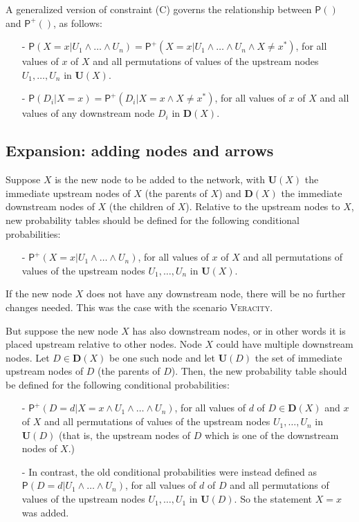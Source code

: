 \documentclass[
  11pt,
  dvipsnames,enabledeprecatedfontcommands]{scrartcl}
\newcommand{\pr}[1]{\ensuremath{\mathsf{P}(#1)}}
\newcommand{\ppr}[2]{\ensuremath{\mathsf{P}^{#1}(#2)}}
\begin{document}
\noindent A generalized version of constraint (C) governs the
relationship between \(\pr{}\) and \(\ppr{+}{}\), as follows:

\begin{itemize}
\item[-] $\pr{X=x \vert U_1 \wedge \dots \wedge U_n}=\ppr{+}{X=x \vert U_1 \wedge \dots \wedge U_n \wedge X\neq x^*}$, for all values of $x$ of $X$ and all permutations of values of the upstream nodes $U_1, \dots, U_n$ in $\mathbf{U}(X)$.
\item[-] $\pr{D_i \vert X =x}=\ppr{+}{D_i \vert X =x \wedge X\neq x^*}$, for all values of $x$ of $X$ and all values of any downstream node $D_i$ in $\mathbf{D}(X)$.
\end{itemize}

\hypertarget{expansion-adding-nodes-and-arrows}{%
\subsection{Expansion: adding nodes and
arrows}\label{expansion-adding-nodes-and-arrows}}

Suppose \(X\) is the new node to be added to the network, with
\(\mathbf{U}(X)\) the immediate upstream nodes of \(X\) (the parents of
\(X\)) and \(\mathbf{D}(X)\) the immediate downstream nodes of \(X\)
(the children of \(X\)). Relative to the upstream nodes to \(X\), new
probability tables should be defined for the following conditional
probabilities:

\begin{itemize}
\item[-] $\ppr{+}{X=x \vert U_1 \wedge \dots \wedge U_n}$, for all values of $x$ of $X$ and all permutations of values of the upstream nodes $U_1, \dots, U_n$ in $\mathbf{U}(X)$.
\end{itemize}

\noindent If the new node \(X\) does not have any downstream node, there
will be no further changes needed. This was the case with the scenario
\textsc{Veracity}.

But suppose the new node \(X\) has also downstream nodes, or in other
words it is placed upstream relative to other nodes. Node \(X\) could
have multiple downstream nodes. Let \(D \in \mathbf{D}(X)\) be one such
node and let \(\mathbf{U}(D)\) the set of immediate upstream nodes of
\(D\) (the parents of \(D\)). Then, the new probability table should be
defined for the following conditional probabilities:

\begin{itemize}
\item[-] $\ppr{+}{D=d \vert X=x \wedge U_1 \wedge \dots \wedge U_n}$, for all values of $d$ of $D \in \mathbf{D}(X)$ and $x$ of $X$ and all permutations of values of the upstream nodes $U_1, \dots, U_n$ in $\mathbf{U}(D)$ (that is, the upstream nodes of $D$ which is one of the downstream nodes of $X$.)
\item[-] In contrast, the old conditional probabilities were instead defined as $\pr{D=d \vert U_1 \wedge \dots \wedge U_n}$, for all values of $d$ of $D$ and all permutations of values of the upstream nodes $U_1, \dots, U_1$ in $\mathbf{U}(D)$.
So the statement $X=x$ was added.
\end{itemize}
\end{document}
